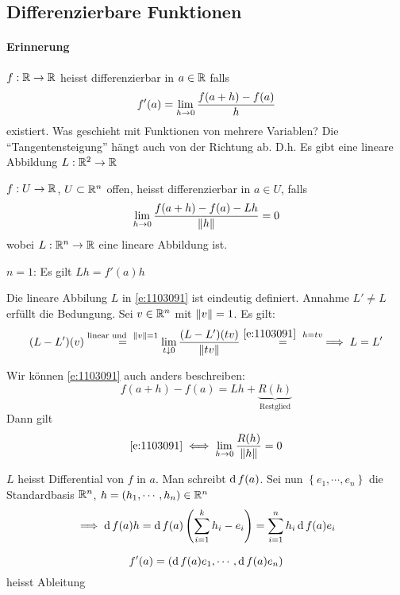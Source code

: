 \subsection{Differenzierbare Funktionen}
\paragraph{Erinnerung} $f:\mathbb{R}\rightarrow \mathbb{R}$ heisst differenzierbar in $a\in \mathbb{R}$ falls
\[f'(a)=\displaystyle\lim_{h\rightarrow0}\frac{f(a+h)-f(a)}{h}\]
existiert. Was geschieht mit Funktionen von mehrere Variablen? Die ``Tangentensteigung'' hängt auch von der Richtung ab. D.h. Es gibt eine lineare Abbildung $L:\mathbb{R}^2\rightarrow\mathbb{R}$
\begin{Def}
  $f:U\rightarrow\mathbb{R}$, $U\subset\mathbb{R}^n$ offen, heisst differenzierbar in $a\in U$, falls
  \begin{equation}
    \label{e:1103091}
    \displaystyle\lim_{h\rightarrow0}\frac{f(a+h)-f(a)-Lh}{\left\| h \right\|}=0
  \end{equation}
  wobei $L:\mathbb{R}^n\rightarrow\mathbb{R}$ eine lineare Abbildung ist.
\end{Def}
\begin{Bem}
  $n=1$: Es gilt $Lh = f'(a)h$
\end{Bem}
\begin{Bem}
  Die lineare Abbilung $L$ in \ref{e:1103091} ist eindeutig definiert. Annahme $L'\neq L$ erfüllt die Bedungung. Sei $v\in\mathbb{R}^n$ mit $\left\| v \right\|=1$. Es gilt:
  \[(L-L')(v)\stackrel{\text{linear und}\hspace{2mm} \left\| v \right\|=1}{=}\lim_{t\downarrow 0}\frac{(L-L')(tv)}{\left\| tv \right\|}\stackrel{\ref{e:1103091}\hspace{2mm} h=tv}{=}\implies L=L'\]
\end{Bem}
\begin{Bem}
  Wir können \ref{e:1103091} auch anders beschreiben:
  \[f(a+h)-f(a)=Lh+\underbrace{R(h)}_{\text{Restglied}}\]
  Dann gilt
  \begin{equation}
    \label{e:1103092}
    \ref{e:1103091} \iff \displaystyle\lim_{h\rightarrow0}\frac{R(h)}{\left\| h \right\|}=0
  \end{equation}
\end{Bem}
\begin{Def}
  $L$ heisst Differential von $f$ in $a$. Man schreibt $\operatorname{d} f(a)$. Sei nun $\left\{ e_1,\cdots,e_n \right\}$ die Standardbasis $\mathbb{R}^n$, $h=(h_1,\cdots,h_n)\in\mathbb{R}^n$
  \[\implies \operatorname{d} f(a)h=\operatorname{d} f(a)\left( \sum_{i=1}^kh_i-e_i \right)=\sum_{i=1}^nh_i\operatorname{d} f(a)e_i\]
\end{Def}
\begin{Def}
  \[f'(a)=(\operatorname{d} f(a)e_1,\cdots,\operatorname{d} f(a)e_n)\]
  heisst Ableitung
\end{Def}
